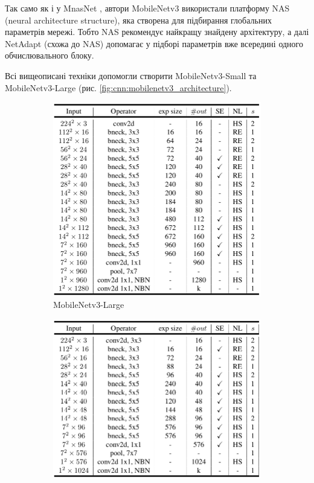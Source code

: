 Так само як і у MnasNet \cite{mnasnet}, автори MobileNetv3 використали платформу NAS (neural
architecture structure), яка створена для підбирання глобальних параметрів мережі.
Тобто NAS рекомендує найкращу знайдену архітектуру, а далі NetAdapt \cite{netadapt} (схожа до NAS) допомагає у підборі
параметрів вже всередині одного обчислювального блоку.

Всі вищеописані техніки допомогли створити MobileNetv3-Small та MobileNetv3-Large
(рис. \ref{fig:cnn:mobilenetv3_architecture}).

\begin{figure}[H]
    \centering
    \begin{subfigure}[c]{0.4\textwidth}
        \centering
        \includegraphics[width=\textwidth]{images/cnn_mobilenetv3_large_architecture}
        \caption{MobileNetv3-Large
        }
    \end{subfigure}
    \begin{subfigure}[c]{0.4\textwidth}
        \centering
        \includegraphics[width=\textwidth]{images/cnn_mobilenetv3_small_architecture}

\end{subfigure}
\end{figure}
